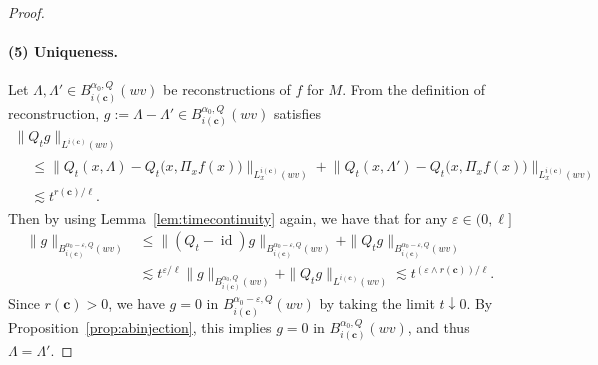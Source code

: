 \documentclass[10pt]{amsart}
\theoremstyle{definition}
\numberwithin{equation}{section}
\newcommand{\bfc}{\mathbf{c}}
\DeclareMathOperator{\id}{id}
\begin{document}
\begin{proof}

\paragraph*{(5) Uniqueness.}
Let $\Lambda,\Lambda'\in B_{i(\bfc)}^{\alpha_0,Q}(wv)$ be reconstructions of $f$ for $M$. From the definition of reconstruction, $g:=\Lambda-\Lambda'\in B_{i(\bfc)}^{\alpha_0,Q}(wv)$ satisfies
\begin{multline*}
\|Q_tg\|_{L^{i(\bfc)}(wv)}\\
\begin{aligned}
&\le\big\|Q_t(x,\Lambda)-Q_t\big(x,\Pi_xf(x)\big)\big\|_{L_x^{i(\bfc)}(wv)}+\big\|Q_t(x,\Lambda')-Q_t\big(x,\Pi_xf(x)\big)\big\|_{L_x^{i(\bfc)}(wv)}\\
&\lesssim t^{r(\bfc)/\ell}.
\end{aligned}
\end{multline*}
Then by using Lemma~\ref{lem:timecontinuity} again, we have that for any $\varepsilon\in(0,\ell]$
\begin{align*}
\|g\|_{B_{i(\bfc)}^{\alpha_0-\varepsilon,Q}(wv)}&\le\|(Q_t-\id)g\|_{B_{i(\bfc)}^{\alpha_0-\varepsilon,Q}(wv)}+\|Q_tg\|_{B_{i(\bfc)}^{\alpha_0-\varepsilon,Q}(wv)}\\
&\lesssim t^{\varepsilon/\ell}\|g\|_{B_{i(\bfc)}^{\alpha_0,Q}(wv)}+\|Q_tg\|_{L^{i(\bfc)}(wv)}
\lesssim t^{(\varepsilon\wedge r(\bfc))/\ell}.
\end{align*}
Since $r(\bfc)>0$, we have $g=0$ in $B_{i(\bfc)}^{\alpha_0-\varepsilon,Q}(wv)$ by taking the limit $t\downarrow0$. By Proposition~\ref{prop:abinjection}, this implies $g=0$ in $B_{i(\bfc)}^{\alpha_0,Q}(wv)$, and thus $\Lambda=\Lambda'$.
\end{proof}
\end{document}
